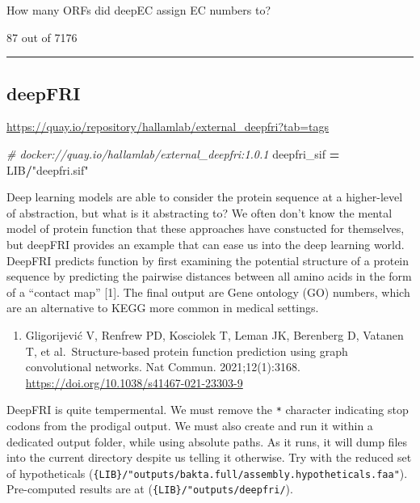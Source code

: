 \documentclass[
]{book}
\newenvironment{Shaded}{\begin{snugshade}}{\end{snugshade}}
\newcommand{\CommentTok}[1]{\textcolor[rgb]{0.56,0.35,0.01}{\textit{#1}}}
\newcommand{\NormalTok}[1]{#1}
\newcommand{\OperatorTok}[1]{\textcolor[rgb]{0.81,0.36,0.00}{\textbf{#1}}}
\newcommand{\StringTok}[1]{\textcolor[rgb]{0.31,0.60,0.02}{#1}}
\providecommand{\tightlist}{%
  \setlength{\itemsep}{0pt}\setlength{\parskip}{0pt}}
\begin{document}
How many ORFs did deepEC assign EC numbers to?

87 out of 7176

\begin{center}\rule{0.5\linewidth}{0.5pt}\end{center}

\subsection{deepFRI}\label{deepfri}

\url{https://quay.io/repository/hallamlab/external_deepfri?tab=tags}

\begin{Shaded}
\begin{Highlighting}[numbers=left,,]
\CommentTok{\# docker://quay.io/hallamlab/external\_deepfri:1.0.1}
\NormalTok{deepfri\_sif }\OperatorTok{=}\NormalTok{ LIB}\OperatorTok{/}\StringTok{"deepfri.sif"}
\end{Highlighting}
\end{Shaded}

Deep learning models are able to consider the protein sequence at a higher-level of abstraction, but what is it abstracting to?
We often don't know the mental model of protein function that these approaches have constucted for themselves, but deepFRI provides
an example that can ease us into the deep learning world. DeepFRI predicts function by first examining the potential structure
of a protein sequence by predicting the pairwise distances between all amino acids in the form of a ``contact map'' {[}1{]}. The final output
are Gene ontology (GO) numbers, which are an alternative to KEGG more common in medical settings.

\begin{enumerate}
\def\labelenumi{\arabic{enumi}.}
\tightlist
\item
  Gligorijević V, Renfrew PD, Kosciolek T, Leman JK, Berenberg D, Vatanen T, et al.~Structure-based protein function prediction using graph convolutional networks. Nat Commun. 2021;12(1):3168. \url{https://doi.org/10.1038/s41467-021-23303-9}
\end{enumerate}

DeepFRI is quite tempermental. We must remove the \texttt{*} character indicating stop codons from the prodigal output.
We must also create and run it within a dedicated output folder, while using absolute paths.
As it runs, it will dump files into the current directory despite us telling it otherwise.
Try with the reduced set of hypotheticals (\texttt{\{LIB\}/"outputs/bakta.full/assembly.hypotheticals.faa"}).
Pre-computed results are at (\texttt{\{LIB\}/"outputs/deepfri/}).
\end{document}
